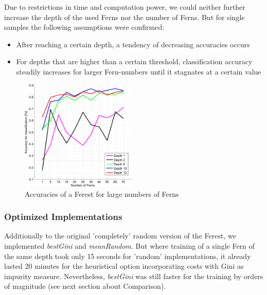 \documentclass[twocolumn]{article}
\begin{document}
Due to restrictions in time and computation power, we could neither further increase the depth of the used Ferns nor the number of Ferns. But for single samples the following assumptions were confirmed: 
\begin{itemize}
\item After reaching a certain depth, a tendency of decreasing accuracies occurs
\item For depths that are higher than a certain threshold, classification accuracy steadily increases for larger Fern-numbers until it stagnates at a certain value
\end{itemize} 

\begin{figure}[h] 
\centering
\includegraphics[width=0.49\textwidth]{Diagrams/accuracies_RandFerns_12_70}
\caption{Accuracies of a Ferest for large numbers of Ferns}
\label{ferest_accuracies}
\end{figure}

\subsubsection{Optimized Implementations}

Additionally to the original 'completely' random version of the Ferest, we implemented \textit{bestGini} and \textit{meanRandom}. But where training of a single Fern of the same depth took only 15 seconds for 'random' implementations, it already lasted 20 minutes for the heuristical option incorporating costs with Gini as impurity measure. Nevertheless, \textit{bestGini} was still faster for the training by orders of magnitude (see next section about Comparison).
\end{document}
